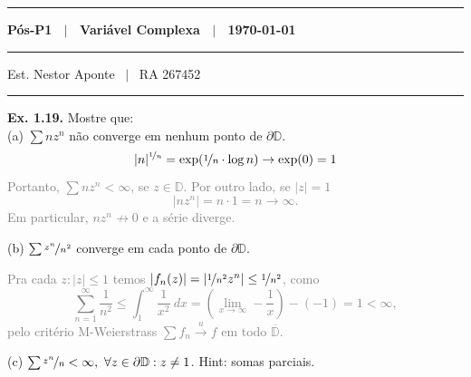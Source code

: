 \newcommand{\F}{\mathbb{F}}
\newcommand{\C}{\mathbb{C}}
\newcommand{\an}{\mathscr{A}} 
\newcommand{\Q}{\mathbb{Q}}
\newcommand{\D}{\mathbb{D}}
\renewcommand{\hom}{\operatorname{Hom}}
\newcommand{\ehom}{\operatorname{End}}

\-\vspace{-0.3cm}
  {\hrule \vspace{-0cm}
  \centering \textbf{Pós-P1 \ \(\mid\) \ Variável Complexa \ \(\mid\) \ \today} \vspace{0.2cm}
  \hrule
  Est. Nestor Aponte \ \(\mid\) \ RA 267452 \vspace{0.2cm}
  \hrule}

\vspace{0.5cm}
\textbf{Ex. 1.19.} Mostre que: \vspace{0.2cm}\\ 
(a) \(\sum nz^n\) não converge em nenhum ponto de \(\partial\D\).
\textcolor{gray}{
\[ |n|^{\nicefrac{1}{n}} = \exp (\nicefrac{1}{n}\cdot \log n ) \to \exp (0)  = 1\]  
Portanto, \(\sum nz^n < \infty\), se \(z \in \D\). Por outro lado, se \(|z| = 1\)
\[|n z^n| = n \cdot 1 = n \to \infty. \]
Em particular, \(nz^n \not\to 0\) e a série diverge.
}

(b) \(\sum \nicefrac{z^n}{n^2}\) converge em cada ponto de \(\partial \D\). 

\textcolor{gray}{
Pra cada \(z : |z|\leq 1\)  temos \(|f_n(z)| = |\nicefrac{1}{n^2} z^n| \leq \nicefrac{1}{n^2}\), como 
\[\sum_{n =1}^\infty \frac{1}{n^2} \leq \int_1^\infty \frac{1}{x^2} \ dx = \left(\lim_{x\to \infty} -\frac{1}{x}\right) - (-1)  = 1 < \infty,\]
pelo critério M-Weierstrass \(\sum f_n \overset{u}{\longrightarrow} f\) em todo \(\overline{\D}\). 
}

(c) \(\sum \nicefrac{z^n}{n}< \infty, \ \forall z \in \partial \D : z \neq 1\). Hint: somas parciais.

